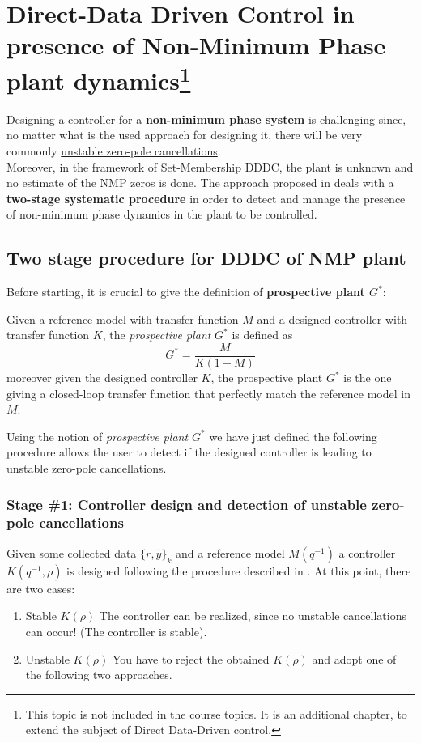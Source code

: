 \chapter[DDDC with NMP plant dynamics]{Direct-Data Driven Control in presence of Non-Minimum Phase plant dynamics\footnote{
    This topic is not included in the course topics. It is an additional chapter, to extend the subject of Direct Data-Driven control. 
}}

Designing a controller for a \textbf{non-minimum phase system} is challenging since, no matter what is the used approach for designing it, there will be very commonly \underline{unstable zero-pole cancellations}.\\
Moreover, in the framework of Set-Membership DDDC, the plant is unknown and no estimate of the NMP zeros is done. The approach proposed in \citeauthor{cerone2017_NMP} \cite{cerone2017_NMP} deals with a \textbf{two-stage systematic procedure} in order to detect and manage the presence of non-minimum phase dynamics in the plant to be controlled. 

\section{Two stage procedure for DDDC of NMP plant}
Before starting, it is crucial to give the definition of \textbf{prospective plant $G^*$}:
\begin{definition}
    Given a reference model with transfer function $M$ and a designed controller with transfer function $K$, the \textit{prospective plant} $G^*$  is defined as 
    \begin{equation}
        G^*=\frac{M}{K(1-M)}
    \end{equation}
    moreover given the designed controller $K$, the prospective plant $G^*$ is the one giving a closed-loop transfer function that perfectly match the reference model in $M$.
\end{definition}

Using the notion of \textit{prospective plant $G^*$} we have just defined the following procedure allows the user to detect if the designed controller is leading to unstable zero-pole cancellations.

\subsection{Stage \#1: Controller design and detection of unstable zero-pole cancellations}
Given some collected data $\{r,\tilde{y}\}_k$ and a reference model $M(q^{-1})$ a controller $K(q^{-1},\rho)$ is designed following the procedure described in . At this point, there are two cases:
\begin{enumerate}
    \itemsep-0.3em
    \item \textsf{Stable $K(\rho)$} The controller can be realized, since no unstable cancellations can occur! (The controller is stable).
    \item \textsf{Unstable $K(\rho)$} You have to reject the obtained $K(\rho)$ and adopt one of the following two approaches.
\end{enumerate}

